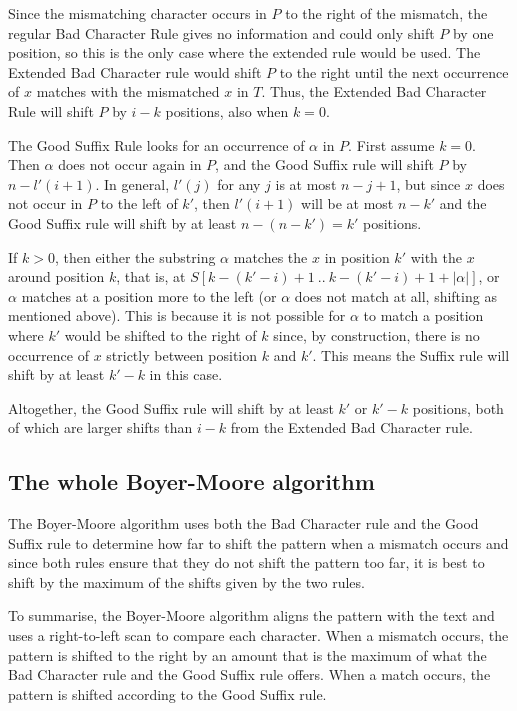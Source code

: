 Since the mismatching character occurs in $P$ to the right of the mismatch, the regular Bad Character Rule gives no information and could only shift $P$ by one position, so this is the only case where the extended rule would be used. The Extended Bad Character rule would shift $P$ to the right until the next occurrence of $x$ matches with the mismatched $x$ in $T$. Thus, the Extended Bad Character Rule will shift $P$ by $i-k$ positions, also when $k=0$. 

The Good Suffix Rule looks for an occurrence of $\alpha$ in $P$. First assume $k=0$. Then $\alpha$ does not occur again in $P$, and the Good Suffix rule will shift $P$ by $n-l'(i+1)$. In general, $l'(j)$ for any $j$ is at most $n-j+1$, but since $x$ does not occur in $P$ to the left of $k'$, then $l'(i+1)$ will be at most $n-k'$ and the Good Suffix rule will shift by at least $n-(n-k') = k'$ positions. 

If $k>0$, then either the substring $\alpha$ matches the $x$ in position $k'$ with the $x$ around position $k$, that is, at $S[k-(k'-i)+1\ ..\ k-(k'-i)+1+|\alpha|]$, or $\alpha$ matches at a position more to the left (or $\alpha$ does not match at all, shifting as mentioned above). This is because it is not possible for $\alpha$ to match a position where $k'$ would be shifted to the right of $k$ since, by construction, there is no occurrence of $x$ strictly between position $k$ and $k'$. This means the Suffix rule will shift by at least $k'-k$ in this case. 

Altogether, the Good Suffix rule will shift by at least $k'$ or $k'-k$ positions, both of which are larger shifts than $i-k$ from the Extended Bad Character rule. 

\rightline{$\square$}

\subsection{The whole Boyer-Moore algorithm}

The Boyer-Moore algorithm uses both the Bad Character rule and the Good Suffix rule to determine how far to shift the pattern when a mismatch occurs and since both rules ensure that they do not shift the pattern too far, it is best to shift by the maximum of the shifts given by the two rules. 

To summarise, the Boyer-Moore algorithm aligns the pattern with the text and uses a right-to-left scan to compare each character. When a mismatch occurs, the pattern is shifted to the right by an amount that is the maximum of what the Bad Character rule and the Good Suffix rule offers. When a match occurs, the pattern is shifted according to the Good Suffix rule. 

